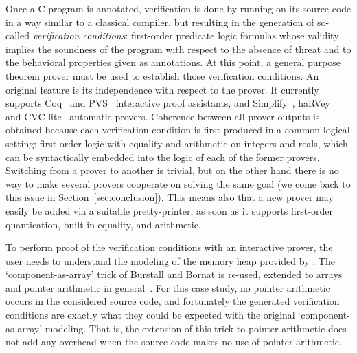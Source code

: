 Once a C program is annotated, verification is done by running
\caduceus{} on its source code in a way similar to a classical
compiler, but resulting in the generation of so-called
\emph{verification conditions}: first-order predicate logic formulas
whose validity implies the soundness of the program with respect to
the absence of threat and to the behavioral properties given as
annotations. At this point, a general purpose theorem prover must be
used to establish those verification conditions.  An original
\caduceus{} feature is its independence with respect to the prover. It
currently supports Coq~\cite{CoqProofAssistant} and PVS~\cite{PVS}
interactive proof assistants, and Simplify~\cite{simplify},
haRVey~\cite{ranise03harvey} and CVC-lite~\cite{barrett04cav}
automatic provers. Coherence between all prover outputs is obtained
because each verification condition is first produced in a common logical
setting: first-order logic with equality and arithmetic on integers
and reals, which can be syntactically embedded into the logic of each
of the former provers. Switching from a prover to another is trivial,
but on the other hand there is no way to make several provers cooperate
on solving the same goal (we come back to this issue in
Section~\ref{sec:conclusion}).  This means also that a new prover may
easily be added via a suitable pretty-printer, as soon as it supports
first-order quantication, built-in equality, and arithmetic.

To perform proof of the verification conditions with an
interactive prover, the user needs to understand the
modeling of the memory heap provided by \caduceus{}. The
`component-as-array' trick of Burstall and Bornat is re-used, extended
to arrays and pointer arithmetic in
general~\cite{filliatre04icfem}. For this case study, no pointer
arithmetic occurs in the considered source code, and fortunately the
generated verification conditions are exactly what they could be
expected with the original `component-as-array' modeling. That is, the
extension of this trick to pointer arithmetic does not add any
overhead when the source code makes no use of pointer arithmetic.

